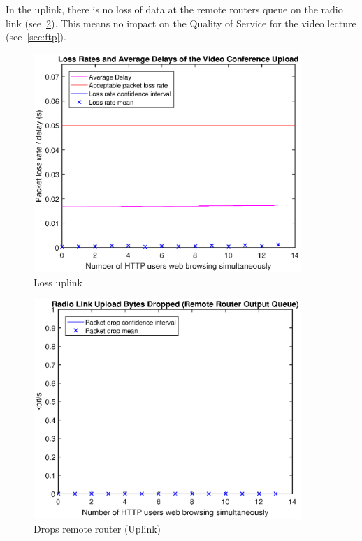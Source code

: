 \documentclass[a4paper,10pt]{book}\usepackage{graphicx}
\begin{document}
In the uplink, there is no loss of data at the remote routers queue on the radio link (see~\ref{fig:remoteRdrops}).
This means no impact on the Quality of Service for the video lecture (see~\ref{sec:ftp}).
\begin{figure}[!ht]
  \centering
  
    \includegraphics[width=0.9\textwidth]{off_loss_conf_upload.eps}
    \caption{Loss uplink}
     \label{fig:losslecup}
\end{figure}
\begin{figure}[!ht]
  \centering
    \includegraphics[width=0.9\textwidth]{on_remote_router_drops.eps}
    \caption{Drops remote router (Uplink)}
     \label{fig:remoteRdrops}
\end{figure}
\end{document}
